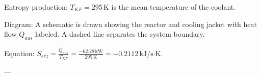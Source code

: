 Entropy production:  
\( T_{KF} = 295 \, \text{K} \) is the mean temperature of the coolant.  

Diagram:  
A schematic is drawn showing the reactor and cooling jacket with heat flow \( Q_{aus} \) labeled. A dashed line separates the system boundary.  

Equation:  
\( \dot{S}_{erz} = \frac{\dot{Q}_{aus}}{T_{KF}} = \frac{-62.28 \, \text{kW}}{295 \, \text{K}} = -0.2112 \, \text{kJ/s·K} \).  

---